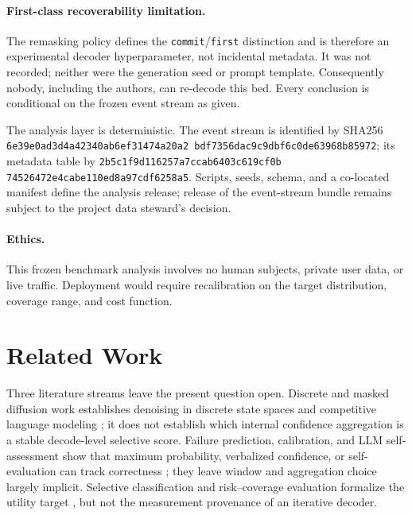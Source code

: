 \documentclass{article}
\begin{document}
\paragraph{First-class recoverability limitation.}
The remasking policy defines the \texttt{commit}/\texttt{first} distinction and is therefore an
experimental decoder hyperparameter, not incidental metadata.  It was not recorded; neither
were the generation seed or prompt template.  Consequently nobody, including the authors, can
re-decode this bed.  Every conclusion is conditional on the frozen event stream as given.

The analysis layer is deterministic.  The event stream is identified by
SHA256 \texttt{6e39e0ad3d4a4234\allowbreak 0ab6ef31474a20a2\allowbreak
bdf7356dac9c9dbf\allowbreak 6c0de63968b85972}; its
metadata table by
\texttt{2b5c1f9d116257a7\allowbreak ccab6403c619cf0b\allowbreak
74526472e4cabe11\allowbreak 0ed8a97cdf6258a5}.
Scripts, seeds, schema, and a co-located manifest define the analysis release; release of the
event-stream bundle remains subject to the project data steward's decision.

\paragraph{Ethics.}
This frozen benchmark analysis involves no human subjects, private user data, or live traffic.
Deployment would require recalibration on the target distribution, coverage range, and cost
function.

\section{Related Work}
\label{sec:related}

Three literature streams leave the present question open.  Discrete and masked diffusion work
establishes denoising in discrete state spaces and competitive language modeling
\citep{austin2021structured,sahoo2024mdlm,llda,ssdlm,dream2025}; it does not establish which
internal confidence aggregation is a stable decode-level selective score.  Failure prediction,
calibration, and LLM self-assessment show that maximum probability, verbalized confidence, or
self-evaluation can track correctness
\citep{hendrycks2017baseline,guo2017calibration,lin2022teaching,kadavath2022mostly,
kuhn2023semantic}; they leave window and aggregation choice largely implicit.  Selective
classification and risk--coverage evaluation formalize the utility target
\citep{chow1970character,elyaniv2010foundations,geifman2017selective,geifman2019selectivenet,
ding2020revisiting}, but not the measurement provenance of an iterative decoder.
\end{document}
